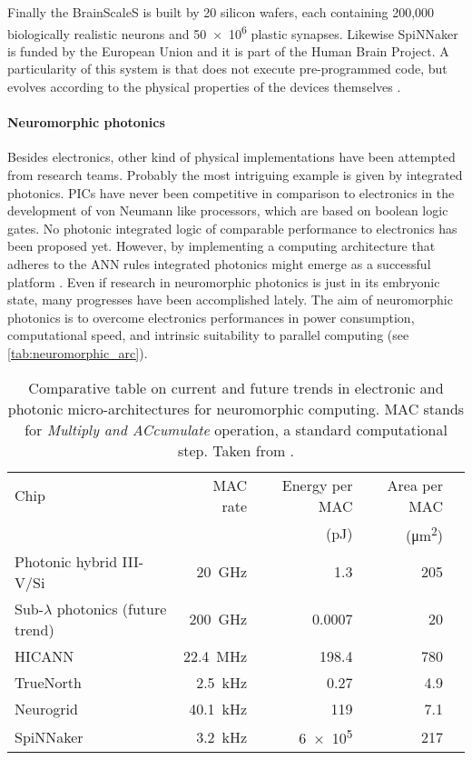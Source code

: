 Finally the BrainScaleS is built by 20 silicon wafers, each containing  200,000 biologically realistic neurons and \num{50e6} plastic synapses.
Likewise SpiNNaker is funded by the European Union and it is part of the Human Brain Project.
A particularity of this system is that does not execute pre-programmed code, but evolves according to the physical properties of the devices themselves \cite{HBP.eu}.

\paragraph{Neuromorphic photonics\\}
Besides electronics, other kind of physical implementations have been attempted from research teams.
Probably the most intriguing example is given by integrated photonics.
\acp{PIC} have never been competitive in comparison to electronics in the development of von Neumann like processors, which are based on boolean logic gates.
No photonic integrated logic of comparable performance to electronics has been proposed yet.
However, by implementing a computing architecture that adheres to the \ac{ANN} rules integrated photonics might emerge as a successful platform \cite{de2017progress}.
Even if research in neuromorphic photonics is just in its embryonic state, many progresses have been accomplished lately.
The aim of neuromorphic photonics is to overcome electronics performances in power consumption, computational speed, and intrinsic suitability to parallel computing (see \autoref{tab:neuromorphic_arc}).

\begin{table}[!htbp]
	\centering
	\footnotesize
	\begin{tabular}{l r r r r}
	\toprule
	\normalsize Chip & \normalsize \acs{MAC} rate &%
	\normalsize Energy per \acs{MAC} & \normalsize Area per \acs{MAC} \\
	& & (\si{\pico\joule}) & (\si{\square\um})\\
	\midrule
	Photonic hybrid III-V/Si & \SI{20}{\GHz} & \num{1.3} 	& 205 \\
	Sub-$\lambda$ photonics (future trend) & \SI{200}{\GHz} & \num{0.0007} 	& 20 \\
	HICANN & \SI{22.4}{\MHz} & \num{198.4} 	& 780 \\
	TrueNorth & \SI{2.5}{\kHz} & \num{0.27} 	& 4.9 \\
	Neurogrid & \SI{40.1}{\kHz} & \num{119} 	& 7.1 \\
	SpiNNaker & \SI{3.2}{\kHz} & \num{6e5} 	& 217 \\
	\bottomrule
	\end{tabular}
	\caption{Comparative table on current and future trends in electronic and photonic micro-architectures for neuromorphic computing. \acs{MAC} stands for \textit{Multiply and ACcumulate} operation, a standard computational step. Taken from \cite{de2017progress}.}
	\label{tab:neuromorphic_arc}
\end{table}

